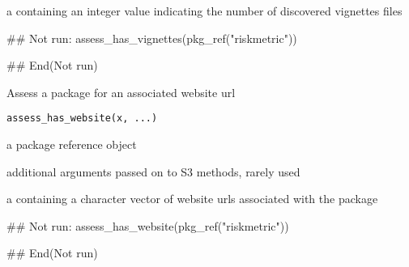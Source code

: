 \documentclass[a4paper]{book}
\begin{document}
%
\begin{Value}
a  containing an integer value indicating the number of discovered vignettes files
\end{Value}
%
\begin{SeeAlso}
\end{SeeAlso}
%
\begin{Examples}
\begin{ExampleCode}
## Not run: 
assess_has_vignettes(pkg_ref("riskmetric"))

## End(Not run)
\end{ExampleCode}
\end{Examples}
%
\begin{Description}
Assess a package for an associated website url
\end{Description}
%
\begin{Usage}
\begin{verbatim}
assess_has_website(x, ...)
\end{verbatim}
\end{Usage}
%
\begin{Arguments}
\begin{ldescription}
\item[\code{x}] a  package reference object

\item[\code{...}] additional arguments passed on to S3 methods, rarely used
\end{ldescription}
\end{Arguments}
%
\begin{Value}
a  containing a character vector of website urls associated with the package
\end{Value}
%
\begin{SeeAlso}
\end{SeeAlso}
%
\begin{Examples}
\begin{ExampleCode}
## Not run: 
assess_has_website(pkg_ref("riskmetric"))

## End(Not run)
\end{ExampleCode}
\end{Examples}
\end{document}
